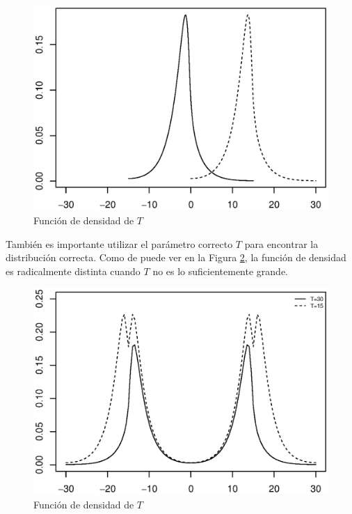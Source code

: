 \documentclass[11pt]{article}
\numberwithin{equation}{section} %
\begin{document}
\begin{figure}[htbp] \centering
\includegraphics[scale=0.75,trim=0 1cm 0 1cm]{probpmshift.eps}
\caption{Función de densidad de $T$}
\label{probmtshift}
\end{figure}

También es importante utilizar el parámetro correcto $T$ para encontrar la distribución correcta. Como de puede ver en la Figura \ref{probmtpar}, la función de densidad es radicalmente distinta cuando $T$ no es lo suficientemente grande.

\begin{figure}[htbp] \centering
\includegraphics[scale=0.75,trim=0 1cm 0 1cm]{probpmpar.eps}
\caption{Función de densidad de $T$}
\label{probmtpar}
\end{figure}

\clearpage

\listoftables
\clearpage

\listoffigures
\clearpage

\nocite{*}



\end{document}
